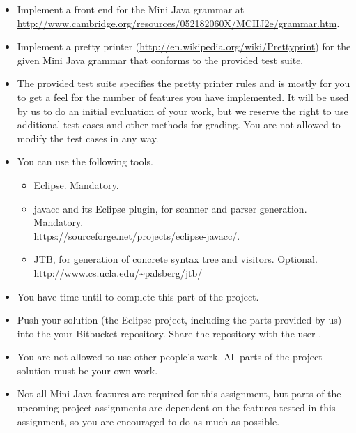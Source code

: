 \begin{itemize} 
\item Implement a front end for the Mini Java grammar at\\
  \url{http://www.cambridge.org/resources/052182060X/MCIIJ2e/grammar.htm}.

\item Implement a pretty printer (\url{http://en.wikipedia.org/wiki/Prettyprint}) for the given Mini Java grammar that conforms to the provided test suite.

\item The provided test suite specifies the pretty printer rules and is mostly for you to get a feel for the number of features you have implemented.
  It will be used by us to do an initial evaluation of your work, but we reserve the right to use additional test cases and other methods for grading.
  You are not allowed to modify the test cases in any way.

\item You can use the following tools.
  \begin{itemize}
  \item Eclipse. Mandatory.
  \item javacc and its Eclipse plugin, for scanner and parser generation. Mandatory.\\
    \url{https://sourceforge.net/projects/eclipse-javacc/}.
  \item JTB, for generation of concrete syntax tree and visitors. Optional.\\
    \url{http://www.cs.ucla.edu/~palsberg/jtb/}
  \end{itemize}

\item You have time until  to complete this part of the project.

\item Push your solution (the Eclipse project, including the parts provided by us) into the your Bitbucket repository. Share the repository with the user . 

\item You are not allowed to use other people’s work.
  All parts of the project solution must be your own work.

\item Not all Mini Java features are required for this assignment, but parts of the upcoming project assignments are dependent on the features tested in this assignment, so you are encouraged to do as much as possible. 
\end{itemize}


